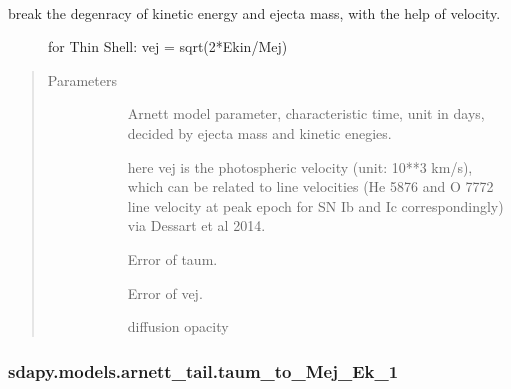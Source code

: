 \documentclass[letterpaper,10pt,english]{sphinxmanual}
\begin{document}
\begin{fulllineitems}
\label{\detokenize{generated/sdapy.models.arnett_tail.taum_to_Mej_Ek:sdapy.models.arnett_tail.taum_to_Mej_Ek}}~\begin{description}
\item[{break the degenracy of kinetic energy and ejecta mass, with the help of velocity.}] \leavevmode
for Thin Shell:  vej = sqrt(2*Ekin/Mej)

\end{description}
\begin{quote}\begin{description}
\item[{Parameters}] \leavevmode\begin{description}
\item[{}] \leavevmode{[}\sphinxtitleref{float}{]}
Arnett model parameter, characteristic time, unit in days, decided by ejecta mass and kinetic enegies.

\item[{}] \leavevmode{[}\sphinxtitleref{float}{]}
here vej is the photospheric velocity (unit: 10**3 km/s), which can be related to
line velocities (He 5876 and O 7772 line velocity at peak epoch for SN Ib and Ic correspondingly)
via Dessart et al 2014.

\item[{}] \leavevmode{[}\sphinxtitleref{float}{]}
Error of taum.

\item[{}] \leavevmode{[}\sphinxtitleref{float}{]}
Error of vej.

\item[{}] \leavevmode{[}\sphinxtitleref{float}{]}
diffusion opacity

\end{description}

\end{description}\end{quote}

\end{fulllineitems}



\subsubsection{sdapy.models.arnett\_tail.taum\_to\_Mej\_Ek\_1}
\label{\detokenize{generated/sdapy.models.arnett_tail.taum_to_Mej_Ek_1:sdapy-models-arnett-tail-taum-to-mej-ek-1}}\label{\detokenize{generated/sdapy.models.arnett_tail.taum_to_Mej_Ek_1::doc}}
\end{document}
